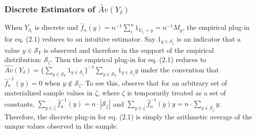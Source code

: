 \documentclass[12pt]{amsart}
\theoremstyle{plain}%
\theoremstyle{definition}
\theoremstyle{remark}
\numberwithin{equation}{section}
\begin{document}
\subsubsection{Discrete Estimators of $\tilde{Av}(Y_{\delta})$}
When $Y_{\delta_i}$ is discrete and $\hat{f}_{n} (y) = n^{-1} \sum_i^n 1_{Y_{\delta_i} = y} = n^{-1} M_y$, the empirical plug-in for eq. (2.1) reduces to an intuitive estimator. Say $1_{y \in \mathcal{S}_{\zeta}}$ is an indicator that a value $y \in \mathcal{S}_Y$ is observed and therefore in the support of the empirical distribution: $\mathcal{S}_{\zeta}$. Then the empirical plug-in for eq. (2.1) reduces to $\hat{Av}(Y_{\delta}) = \{ \sum_{y \in \mathcal{S}_Y} 1_{y \in \mathcal{S}_{\zeta}} \}^{-1} \sum_{y \in \mathcal{S}_Y} 1_{y \in \mathcal{S}_{\zeta}} y$ under the convention that $\hat{f}^{-1}_n (y) =0$ when $y \notin \mathcal{S}_{\zeta}$. To see this, observe that for an arbitrary set of materialized sample values in $\zeta$, where $\zeta$ is temporarily treated as a set of constants, $\sum_{y \in \zeta} \hat{f}_n^{-1} (y) = n\cdot |\mathcal{S}_{\zeta}|$ and $\sum_{y \in \zeta} \hat{f}_n^{-1} (y) y = n \cdot \sum_{y \in \mathcal{S}_{\zeta}} y$. Therefore, the discrete plug-in for eq. (2.1) is simply the arithmetic average of the unique values observed in the sample.
\end{document}
